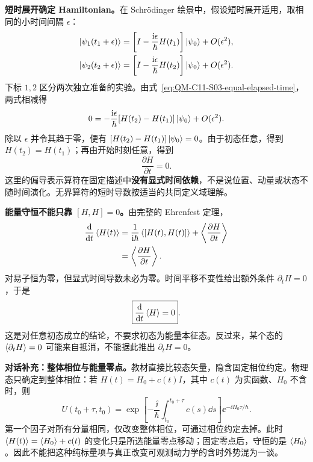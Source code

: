 \textbf{短时展开确定 Hamiltonian。}在 Schr\"odinger 绘景中，假设短时展开适用，取相同的小时间间隔 $\epsilon$：
\begin{align}
  \left|\psi_1(t_1+\epsilon)\right\rangle
    &=\left[I-\frac{\mathrm{i}\epsilon}{\hbar}H(t_1)\right]
       \left|\psi_0\right\rangle+O(\epsilon^2),\\
  \left|\psi_2(t_2+\epsilon)\right\rangle
    &=\left[I-\frac{\mathrm{i}\epsilon}{\hbar}H(t_2)\right]
       \left|\psi_0\right\rangle+O(\epsilon^2).
\end{align}
下标 $1,2$ 区分两次独立准备的实验。由式~\eqref{eq:QM-C11-S03-equal-elapsed-time}，两式相减得
\begin{equation}
  0=-\frac{\mathrm{i}\epsilon}{\hbar}
     [H(t_2)-H(t_1)]\left|\psi_0\right\rangle+O(\epsilon^2).
\end{equation}
除以 $\epsilon$ 并令其趋于零，便有 $[H(t_2)-H(t_1)]\left|\psi_0\right\rangle=0$。由于初态任意，得到 $H(t_2)=H(t_1)$；再由开始时刻任意，得到
\begin{equation}
  \boxed{\frac{\partial H}{\partial t}=0}.
\end{equation}
这里的偏导表示算符在固定描述中\textbf{没有显式时间依赖}，不是说位置、动量或状态不随时间演化。无界算符的短时导数按适当的共同定义域理解。

\textbf{能量守恒不能只靠 $[H,H]=0$。}由完整的 Ehrenfest 定理，
\begin{align}
  \frac{\mathop{}\!\mathrm{d}}{\mathop{}\!\mathrm{d} t}\left\langle H(t) \right\rangle
    &=\frac1{\mathrm{i}\hbar}\left\langle [H(t),H(t)] \right\rangle
       +\left\langle \frac{\partial H}{\partial t} \right\rangle\notag\\
    &=\left\langle \frac{\partial H}{\partial t} \right\rangle.
\end{align}
对易子恒为零，但显式时间导数未必为零。时间平移不变性给出额外条件 $\partial_tH=0$，于是
\begin{equation}
  \boxed{\frac{\mathop{}\!\mathrm{d}}{\mathop{}\!\mathrm{d} t}\left\langle H \right\rangle=0}.
\end{equation}
这是对任意初态成立的结论，不要求初态为能量本征态。反过来，某个态的 $\left\langle \partial_tH \right\rangle=0$ 可能来自抵消，不能据此推出 $\partial_tH=0$。

\textbf{对话补充：整体相位与能量零点。}教材直接比较态矢量，隐含固定相位约定。物理态只确定到整体相位：若 $H(t)=H_0+c(t)I$，其中 $c(t)$ 为实函数、$H_0$ 不含时，则
\begin{equation}
  U(t_0+\tau,t_0)
   =\exp\!\left[-\frac{\ii}{\hbar}
      \int_{t_0}^{t_0+\tau}c(s)\dd s\right]
      \ee^{-\ii H_0\tau/\hbar}.
\end{equation}
第一个因子对所有分量相同，仅改变整体相位，可通过相位约定去掉。此时 $\left\langle H(t) \right\rangle=\left\langle H_0 \right\rangle+c(t)$ 的变化只是所选能量零点移动；固定零点后，守恒的是 $\left\langle H_0 \right\rangle$。因此不能把这种纯标量项与真正改变可观测动力学的含时外势混为一谈。


